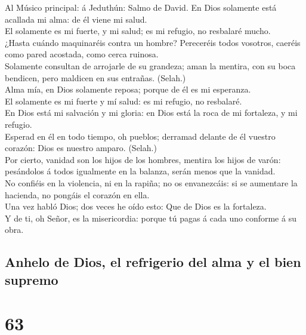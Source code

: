  Al Músico principal: á Jeduthún: Salmo de David. En Dios
solamente está acallada mi alma: de él viene mi salud.\\
 El solamente es mi fuerte, y mi salud; es mi refugio, no
resbalaré mucho.\\
 ¿Hasta cuándo maquinaréis contra un hombre? Pereceréis
todos vosotros, caeréis como pared acostada, como cerca ruinosa.\\
 Solamente consultan de arrojarle de su grandeza; aman la
mentira, con su boca bendicen, pero maldicen en sus entrañas. (Selah.)\\
 Alma mía, en Dios solamente reposa; porque de él es mi
esperanza.\\
 El solamente es mi fuerte y mí salud: es mi refugio, no
resbalaré.\\
 En Dios está mi salvación y mi gloria: en Dios está la
roca de mi fortaleza, y mi refugio.\\
 Esperad en él en todo tiempo, oh pueblos; derramad
delante de él vuestro corazón: Dios es nuestro amparo. (Selah.)\\
 Por cierto, vanidad son los hijos de los hombres, mentira
los hijos de varón: pesándolos á todos igualmente en la balanza, serán
menos que la vanidad.\\
 No confiéis en la violencia, ni en la rapiña; no os
envanezcáis: si se aumentare la hacienda, no pongáis el corazón en
ella.\\
 Una vez habló Dios; dos veces he oído esto: Que de Dios
es la fortaleza.\\
 Y de ti, oh Señor, es la misericordia: porque tú pagas á
cada uno conforme á su obra.

\hypertarget{anhelo-de-dios-el-refrigerio-del-alma-y-el-bien-supremo}{%
\subsection{Anhelo de Dios, el refrigerio del alma y el bien
supremo}\label{anhelo-de-dios-el-refrigerio-del-alma-y-el-bien-supremo}}

\hypertarget{section-19-63}{%
\section{63}\label{section-19-63}}

